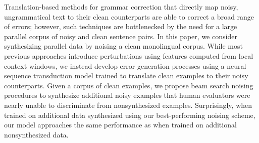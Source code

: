Translation-based methods for grammar correction that directly map noisy, ungrammatical text to their clean counterparts are able to correct a broad range of errors; however, such techniques are bottlenecked by the need for a large parallel corpus of noisy and clean sentence pairs. In this paper, we consider synthesizing parallel data by noising a clean monolingual corpus. While most previous approaches introduce perturbations using features computed from local context windows, we instead develop error generation processes using a neural sequence transduction model trained to translate clean examples to their noisy counterparts. Given a corpus of clean examples, we propose beam search noising procedures to synthesize additional noisy examples that human evaluators were nearly unable to discriminate from nonsynthesized examples. Surprisingly, when trained on additional data synthesized using our best-performing noising scheme, our model approaches the same performance as when trained on additional nonsynthesized data.
